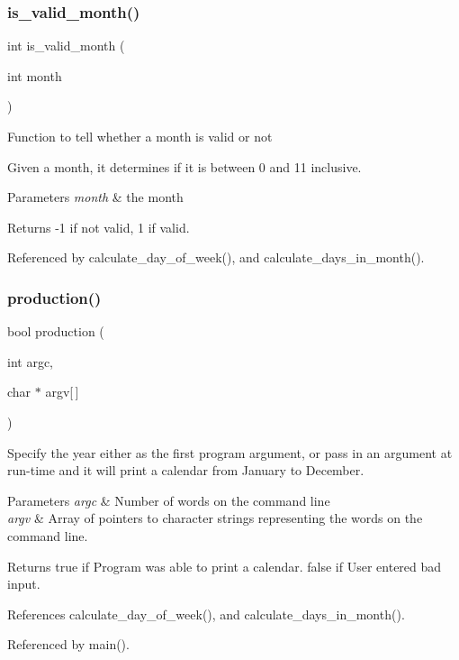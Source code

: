 \subsubsection{is\+\_\+valid\+\_\+month()}
{\footnotesize\ttfamily int is\+\_\+valid\+\_\+month (\begin{DoxyParamCaption}\item[{int}]{month }\end{DoxyParamCaption})}

Function to tell whether a month is valid or not

Given a month, it determines if it is between 0 and 11 inclusive. 
\begin{DoxyParams}{Parameters}
{\em month} & the month \\
\hline
\end{DoxyParams}
\begin{DoxyReturn}{Returns}
-\/1 if not valid, 1 if valid. 
\end{DoxyReturn}


Referenced by calculate\+\_\+day\+\_\+of\+\_\+week(), and calculate\+\_\+days\+\_\+in\+\_\+month().

\mbox{\label{production_8h_a9f67b51c42a54745557e7a2c9c07c46f}} 
\subsubsection{production()}
{\footnotesize\ttfamily bool production (\begin{DoxyParamCaption}\item[{int}]{argc,  }\item[{char $\ast$}]{argv[$\,$] }\end{DoxyParamCaption})}

Specify the year either as the first program argument, or pass in an argument at run-\/time and it will print a calendar from January to December. 
\begin{DoxyParams}{Parameters}
{\em argc} & Number of words on the command line \\
\hline
{\em argv} & Array of pointers to character strings representing the words on the command line. \\
\hline
\end{DoxyParams}
\begin{DoxyReturn}{Returns}
true if Program was able to print a calendar. false if User entered bad input. 
\end{DoxyReturn}


References calculate\+\_\+day\+\_\+of\+\_\+week(), and calculate\+\_\+days\+\_\+in\+\_\+month().



Referenced by main().

